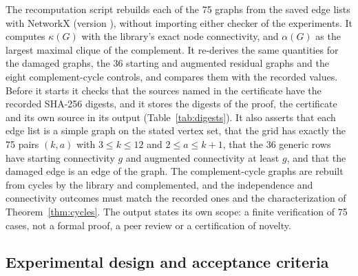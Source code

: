 The recomputation script rebuilds each of the 75 graphs from the saved edge lists with NetworkX \cite{NetworkX} (version \NXVersion), without importing either checker of the experiments.
It computes $\kappa(G)$ with the library's exact node connectivity, and $\alpha(G)$ as the largest maximal clique of the complement.
It re-derives the same quantities for the damaged graphs, the 36 starting and augmented residual graphs and the eight complement-cycle controls, and compares them with the recorded values.
Before it starts it checks that the sources named in the certificate have the recorded SHA-256 digests, and it stores the digests of the proof, the certificate and its own source in its output (Table~\ref{tab:digests}).
It also asserts that each edge list is a simple graph on the stated vertex set, that the grid has exactly the 75 pairs $(k,a)$ with $3\le k\le12$ and $2\le a\le k+1$, that the 36 generic rows have starting connectivity $g$ and augmented connectivity at least $g$, and that the damaged edge is an edge of the graph.
The complement-cycle graphs are rebuilt from cycles by the library and complemented, and the independence and connectivity outcomes must match the recorded ones and the characterization of Theorem~\ref{thm:cycles}.
The output states its own scope: a finite verification of 75 cases, not a formal proof, a peer review or a certification of novelty.

\subsection{Experimental design and acceptance criteria}\label{sec:comp-design}

